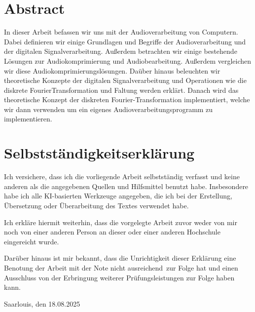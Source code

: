 \documentclass[paper=a4,fontsize=12pt,ngerman]{scrartcl}
\begin{document}
\pagestyle{plain}



\section*{Abstract}
In dieser Arbeit befassen wir uns mit der Audioverarbeitung von Computern. Dabei definieren wir einige Grundlagen und Begriffe der Audioverarbeitung und der
digitalen Signalverarbeitung. Außerdem betrachten wir einige bestehende Lösungen
zur Audiokomprimierung und Audiobearbeitung. Außerdem vergleichen wir diese
Audiokomprimierungslösungen. Daüber hinaus beleuchten wir theoretische Konzepte der digitalen Signalverarbeitung und Operationen wie die diskrete FourierTransformation und Faltung werden erklärt. Danach wird das theoretische Konzept
der diskreten Fourier-Transformation implementiert, welche wir dann verwenden um
ein eigenes Audioverarbeitungsprogramm zu implementieren.

\newpage
\section*{Selbstständigkeitserklärung}
Ich versichere, dass ich die vorliegende Arbeit selbstständig verfasst und 
keine anderen als die angegebenen Quellen und Hilfsmittel benutzt habe.
Insbesondere habe ich alle KI-basierten Werkzeuge angegeben, die ich bei
der Erstellung, Übersetzung oder Überarbeitung des Textes verwendet habe.

Ich erkläre hiermit weiterhin, dass die vorgelegte Arbeit zuvor weder von mir 
noch von einer anderen Person an dieser oder einer anderen Hochschule 
eingereicht wurde.

Darüber hinaus ist mir bekannt, dass die Unrichtigkeit dieser Erklärung eine 
Benotung der Arbeit mit der Note \glqq nicht ausreichend\grqq \ zur Folge hat 
und einen Ausschluss von der Erbringung weiterer Prüfungsleistungen zur Folge 
haben kann.
\bigskip
 
Saarlouis, den 18.08.2025





\clearpage
\tableofcontents 

\clearpage
{}

\end{document}
